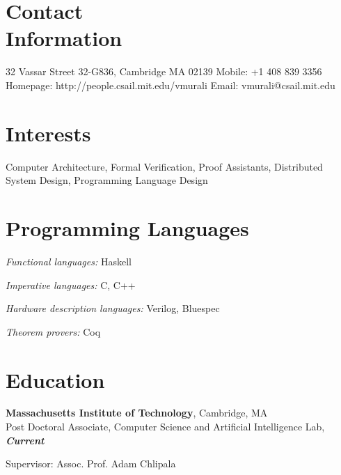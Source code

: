 \documentclass[margin]{resume}
\begin{document}
\begin{resume}

    \section{\mysidestyle Contact\\Information}

    32 Vassar Street 32-G836, Cambridge MA 02139   \hfill Mobile: +1 408 839 3356          \\
    Homepage: http://people.csail.mit.edu/vmurali     \hfill Email: vmurali@csail.mit.edu    \\

    \section{\mysidestyle Interests}

    Computer Architecture, Formal Verification, Proof Assistants, Distributed System Design, Programming Language Design\\


    \section{\mysidestyle Programming Languages}
    \begin{list2}
    \item \emph{Functional languages:} Haskell
    \item \emph{Imperative languages:} C, C++
    \item \emph{Hardware description languages:} Verilog, Bluespec
    \item \emph{Theorem provers:} Coq
    \end{list2}

    \section{\mysidestyle Education}
    \textbf{Massachusetts Institute of Technology}, Cambridge, MA \\
    Post Doctoral Associate, Computer Science and Artificial Intelligence Lab, \hfill \textbf{\textit{Current}}\\
    \begin{list2}
        \item Supervisor:  Assoc. Prof. Adam Chlipala
    \end{list2}%



\end{resume}
\end{document}
